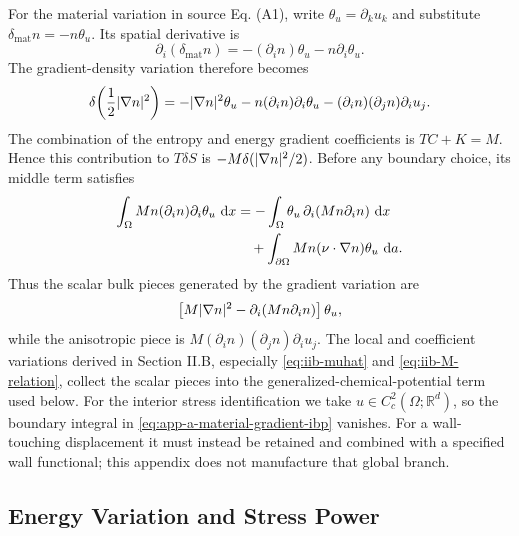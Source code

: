 For the material variation in source Eq. (A1), write
\(\theta_u=\partial_k u_k\) and substitute
\(\delta_{\mathrm{mat}}n=-n\theta_u\).  Its spatial derivative is
\begin{equation}
  \partial_i(\delta_{\mathrm{mat}}n)
  =-(\partial_i n)\theta_u-n\partial_i\theta_u .
  \label{eq:app-a-material-density-gradient}
\end{equation}
The gradient-density variation therefore becomes
\begin{equation}
  \delta\!\left(\frac12|\nabla n|^2\right)
  =
  -|\nabla n|^2\theta_u
  -n(\partial_i n)\partial_i\theta_u
  -(\partial_i n)(\partial_j n)\partial_i u_j .
  \label{eq:app-a-material-gradient-variation}
\end{equation}
The combination of the entropy and energy gradient coefficients is
\(TC+K=M\).  Hence this contribution to \(T\delta S\) is
\(-M\delta(|\nabla n|^2/2)\).  Before any boundary choice, its middle term
satisfies
\begin{align}
  \int_\Omega Mn(\partial_i n)\partial_i\theta_u\,\,\mathrm{d} x
  &=-\int_\Omega
    \theta_u\,\partial_i\!\left(Mn\partial_i n\right)\,\mathrm{d} x
  \nonumber\\
  &\quad+
  \int_{\partial\Omega}
    Mn(\nu\cdot\nabla n)\theta_u\,\,\mathrm{d} a .
  \label{eq:app-a-material-gradient-ibp}
\end{align}
Thus the scalar bulk pieces generated by the gradient variation are
\begin{equation}
  \left[
    M|\nabla n|^2-\partial_i(Mn\partial_i n)
  \right]\theta_u,
  \label{eq:app-a-material-gradient-scalar-bulk}
\end{equation}
while the anisotropic piece is
\(M(\partial_i n)(\partial_j n)\partial_i u_j\).  The local and coefficient
variations derived in Section II.B, especially
\eqref{eq:iib-muhat} and \eqref{eq:iib-M-relation}, collect the scalar pieces
into the generalized-chemical-potential term used below.  For the interior
stress identification we take \(u\in C_c^2(\Omega;\mathbb{R}^d)\), so the
boundary integral in \eqref{eq:app-a-material-gradient-ibp} vanishes.  For a
wall-touching displacement it must instead be retained and combined with a
specified wall functional; this appendix does not manufacture that global
branch.

\subsection{Energy Variation and Stress Power}

